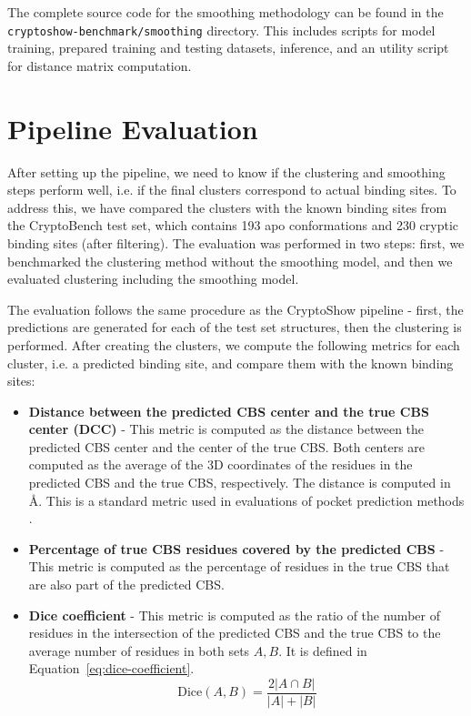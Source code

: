 The complete source code for the smoothing methodology can be found in the \lstinline!cryptoshow-benchmark/smoothing! directory. This includes scripts for model training, prepared training and testing datasets, inference, and an utility script for distance matrix computation.

\section{Pipeline Evaluation}
\label{sec:pipeline-evaluation}

After setting up the pipeline, we need to know if the clustering and smoothing steps perform well, i.e. if the final clusters correspond to actual binding sites. To address this, we have compared the clusters with the known binding sites from the CryptoBench test set, which contains 193 apo conformations and 230 cryptic binding sites (after filtering). The evaluation was performed in two steps: first, we benchmarked the clustering method without the smoothing model, and then we evaluated clustering including the smoothing model.

The evaluation follows the same procedure as the CryptoShow pipeline - first, the predictions are generated for each of the test set structures, then the clustering is performed. After creating the clusters, we compute the following metrics for each cluster, i.e. a predicted binding site, and compare them with the known binding sites:

\begin{itemize}
    \item \textbf{Distance between the predicted CBS center and the true CBS center (DCC)} - This metric is computed as the distance between the predicted CBS center and the center of the true CBS. Both centers are computed as the average of the 3D coordinates of the residues in the predicted CBS and the true CBS, respectively. The distance is computed in \AA. This is a standard metric used in evaluations of pocket prediction methods \cite{kandel2021puresnet}.
    \item \textbf{Percentage of true CBS residues covered by the predicted CBS} - This metric is computed as the percentage of residues in the true CBS that are also part of the predicted CBS.
    \item \textbf{Dice coefficient} - This metric is computed as the ratio of the number of residues in the intersection of the predicted CBS and the true CBS to the average number of residues in both sets $A, B$. It is defined in Equation~\ref{eq:dice-coefficient}.
    \begin{equation}
        \text{Dice}(A, B) = \frac{2 |A \cap B|}{|A| + |B|}
        \label{eq:dice-coefficient}
    \end{equation}
\end{itemize}

